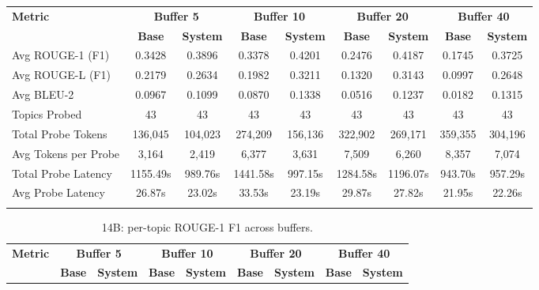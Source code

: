 \documentclass[pdflatex,sn-mathphys-num]{sn-jnl}%
\theoremstyle{thmstyleone}%
\theoremstyle{thmstyletwo}%
\theoremstyle{thmstylethree}%
\begin{document}
\begin{appendices}
\begin{landscape}
\begin{longtable}{@{}p{3.8cm}cccccccc@{}}
\toprule
\textbf{Metric} & \multicolumn{2}{c}{\textbf{Buffer 5}} & \multicolumn{2}{c}{\textbf{Buffer 10}} & \multicolumn{2}{c}{\textbf{Buffer 20}} & \multicolumn{2}{c}{\textbf{Buffer 40}} \\
\cmidrule(lr){2-3}\cmidrule(lr){4-5}\cmidrule(lr){6-7}\cmidrule(lr){8-9}
 & \textbf{Base} & \textbf{System} & \textbf{Base} & \textbf{System} & \textbf{Base} & \textbf{System} & \textbf{Base} & \textbf{System} \\
\midrule
\endhead
Avg ROUGE-1 (F1) & 0.3428 & 0.3896 & 0.3378 & 0.4201 & 0.2476 & 0.4187 & 0.1745 & 0.3725 \\
Avg ROUGE-L (F1) & 0.2179 & 0.2634 & 0.1982 & 0.3211 & 0.1320 & 0.3143 & 0.0997 & 0.2648 \\
Avg BLEU-2 & 0.0967 & 0.1099 & 0.0870 & 0.1338 & 0.0516 & 0.1237 & 0.0182 & 0.1315 \\
Topics Probed & 43 & 43 & 43 & 43 & 43 & 43 & 43 & 43 \\
Total Probe Tokens & 136,045 & 104,023 & 274,209 & 156,136 & 322,902 & 269,171 & 359,355 & 304,196 \\
Avg Tokens per Probe & 3,164 & 2,419 & 6,377 & 3,631 & 7,509 & 6,260 & 8,357 & 7,074 \\
Total Probe Latency & 1155.49s & 989.76s & 1441.58s & 997.15s & 1284.58s & 1196.07s & 943.70s & 957.29s \\
Avg Probe Latency & 26.87s & 23.02s & 33.53s & 23.19s & 29.87s & 27.82s & 21.95s & 22.26s \\
\botrule
\end{longtable}
\normalsize
\end{landscape}
\begin{landscape}
\tiny
\begin{longtable}{@{}p{3.8cm}cccccccc@{}}
\caption{14B: per-topic ROUGE-1 F1 across buffers.}\label{tab:app_14b_rouge1_topics}\\

\toprule
\textbf{Metric} & \multicolumn{2}{c}{\textbf{Buffer 5}} & \multicolumn{2}{c}{\textbf{Buffer 10}} & \multicolumn{2}{c}{\textbf{Buffer 20}} & \multicolumn{2}{c}{\textbf{Buffer 40}} \\
\cmidrule(lr){2-3}\cmidrule(lr){4-5}\cmidrule(lr){6-7}\cmidrule(lr){8-9}
 & \textbf{Base} & \textbf{System} & \textbf{Base} & \textbf{System} & \textbf{Base} & \textbf{System} & \textbf{Base} & \textbf{System} \\
\midrule
\endfirsthead


\end{longtable}
\end{landscape}
\end{appendices}
\end{document}
